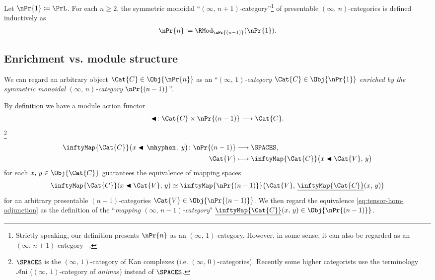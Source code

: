 \documentclass[TQFT_main]{subfiles}
\begin{document}
\begin{mydef}[label=def:nPr]{}
    Let $\nPr{1} \coloneqq \PrL$.
    For each $n \ge 2$,
    the symmetric monoidal ``$(\infty,\, n+1)$-category''\footnote{Strictly speaking, our definition presents $\nPr{n}$ as an $(\infty,\, 1)$-category. However, in some sense, it can also be regarded as an $(\infty,\, n+1)$-category ~\cite[REMARK 1.16.]{Scholze2026Gestalten}.} of presentable $(\infty,\, n)$-categories is defined inductively as
    \begin{align}
        \nPr{n} \coloneqq \RMod_{\nPr{(n-1)}} (\nPr{1}).
    \end{align}
\end{mydef}

\subsection{Enrichment vs. module structure}


We can regard an arbitrary object $\Cat{C} \in \Obj{\nPr{n}}$ as an ``\emph{$(\infty,\, 1)$-category $\Cat{C} \in \Obj{\nPr{1}}$ enriched by the symmetric monoidal $(\infty,\, n)$-category $\nPr{(n-1)}$}''.

By \hyperref[def:nPr]{definition} we have a module action functor
\begin{align}
    \btl \colon \Cat{C} \times \nPr{(n-1)} \lto \Cat{C}.
\end{align}
\footnote{
    $\SPACES$ is the $(\infty,\, 1)$-category of Kan complexes (i.e. $(\infty,\, 0)$-categories). 
    Recently some higher categorists use the terminology $\mathcal{A}\bm{\mathrm{ni}}$ ($(\infty,\, 1)$-category of \emph{anima}s) instead of $\SPACES$.
}
\begin{align}
    \inftyMap{\Cat{C}} \bigl( x \btl \,\mhyphen \,,\, y \bigr) \colon \nPr{(n-1)} &\lto \SPACES, \\
    \Cat{V} &\lmto \inftyMap{\Cat{C}} \bigl( x \btl \Cat{V},\, y \bigr)
\end{align}
for each $x,\, y \in \Obj{\Cat{C}}$ 
guarantees the equivalence of mapping spaces
\begin{align}
    \label{eq:tensor-hom-adjunction}
    \inftyMap{\Cat{C}} (x \btl \Cat{V},\, y) \simeq \inftyMap{\nPr{(n-1)}} \bigl( \Cat{V},\, \underline{\inftyMap{\Cat{C}}} (x,\, y) \bigr) 
\end{align}
for an arbitrary presentable $(n-1)$-categories $\Cat{V} \in \Obj{\nPr{(n-1)}}$.
We then regard the equivalence \eqref{eq:tensor-hom-adjunction} as the definition of the ``\emph{mapping $(\infty,\, n-1)$-category}" $\underline{\inftyMap{\Cat{C}}} (x,\, y) \in \Obj{\nPr{(n-1)}}$.
\end{document}
